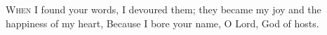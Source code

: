 
\lettrine{W}{hen} I found your words, I devoured them;
   they became my joy and the happiness of my heart,
Because I bore your name,
   O Lord, God of hosts.